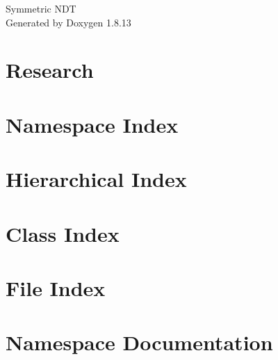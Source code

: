 \documentclass[twoside]{book}
\newcommand{\+}{\discretionary{\mbox{\scriptsize$\hookleftarrow$}}{}{}}
\newcommand{\clearemptydoublepage}{%
  \newpage{\pagestyle{empty}\cleardoublepage}%
}
\begin{document}
\hypersetup{pageanchor=false,
             bookmarksnumbered=true,
             pdfencoding=unicode
            }
\begin{titlepage}
\vspace*{7cm}
\begin{center}%
{\Large Symmetric N\+DT }\\
\vspace*{1cm}
{\large Generated by Doxygen 1.8.13}\\
\end{center}
\end{titlepage}
\clearemptydoublepage
{}
\tableofcontents
\clearemptydoublepage
{}
\hypersetup{pageanchor=true}

\chapter{Research}
\label{index}\hypertarget{index}{}
\chapter{Namespace Index}

\chapter{Hierarchical Index}

\chapter{Class Index}

\chapter{File Index}

\chapter{Namespace Documentation}








\end{document}
